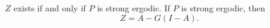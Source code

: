 $Z$ exists if and only if $P$ is strong ergodic. If $P$ is strong ergodic, then
$$Z = A - G(I - A).$$
